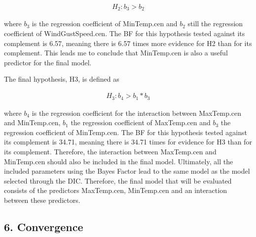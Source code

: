 \documentclass[
]{article}
\begin{document}
\begin{align*}
H_2: b_3 > b_2
\end{align*}

where \(b_3\) is the regression coefficient of MinTemp.cen and \(b_2\)
still the regression coefficient of WindGustSpeed.cen. The BF for this
hypothesis tested against its complement is 6.57, meaning there is 6.57
times more evidence for H2 than for its complement. This leads me to
conclude that MinTemp.cen is also a useful predictor for the final
model.

The final hypothesis, H3, is defined as

\begin{align*}
H_3: b_4 > b_1*b_3
\end{align*}

where \(b_4\) is the regression coefficient for the interaction between
MaxTemp.cen and MinTemp.cen, \(b_1\) the regression coefficient of
MaxTemp.cen and \(b_3\) the regression coefficient of MinTemp.cen. The
BF for this hypothesis tested against its complement is 34.71, meaning
there is 34.71 times for evidence for H3 than for its complement.
Therefore, the interaction between MaxTemp.cen and MinTemp.cen should
also be included in the final model. Ultimately, all the included
parameters using the Bayes Factor lead to the same model as the model
selected through the DIC. Therefore, the final model that will be
evaluated consists of the predictors MaxTemp.cen, MinTemp.cen and an
interaction between these predictors.

\hypertarget{convergence}{%
\subsection{6. Convergence}\label{convergence}}
\end{document}

